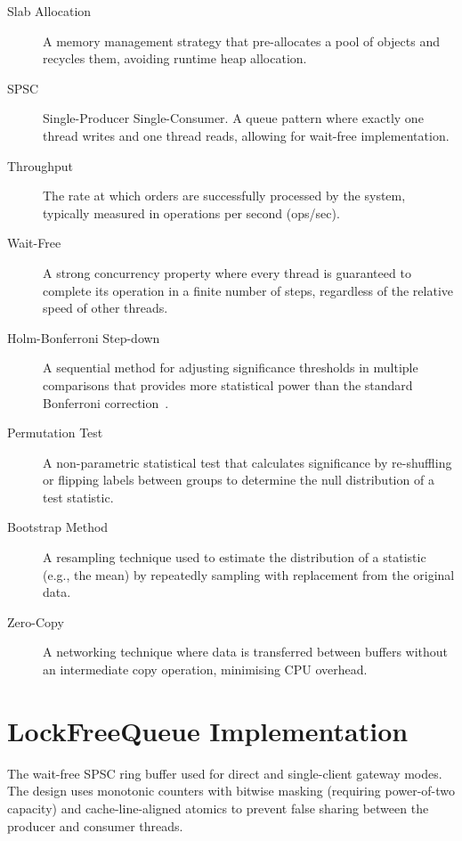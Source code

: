 \documentclass[12pt,a4paper]{report}
\begin{document}
\begin{description}
\item[Slab Allocation] A memory management strategy that pre-allocates a pool of objects and recycles them, avoiding runtime heap allocation.

\item[SPSC] Single-Producer Single-Consumer. A queue pattern where exactly one thread writes and one thread reads, allowing for wait-free implementation.

\item[Throughput] The rate at which orders are successfully processed by the system, typically measured in operations per second (ops/sec).

\item[Wait-Free] A strong concurrency property where every thread is guaranteed to complete its operation in a finite number of steps, regardless of the relative speed of other threads.

\item[Holm-Bonferroni Step-down] A sequential method for adjusting significance thresholds in multiple comparisons that provides more statistical power than the standard Bonferroni correction~\citep{holm1979simple}.

\item[Permutation Test] A non-parametric statistical test that calculates significance by re-shuffling or flipping labels between groups to determine the null distribution of a test statistic.

\item[Bootstrap Method] A resampling technique used to estimate the distribution of a statistic (e.g., the mean) by repeatedly sampling with replacement from the original data.

\item[Zero-Copy] A networking technique where data is transferred between buffers without an intermediate copy operation, minimising CPU overhead.

\end{description}

\chapter{LockFreeQueue Implementation}
The wait-free SPSC ring buffer used for direct and single-client gateway modes. The design uses monotonic counters with bitwise masking (requiring power-of-two capacity) and cache-line-aligned atomics to prevent false sharing between the producer and consumer threads.
\end{document}
